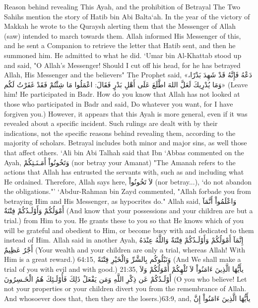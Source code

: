 \documentclass[11pt,a4paper,openany]{book}
\let\textAR\textarabic
\begin{document}
\begin{tafsirbox}
Reason behind revealing This Ayah, and the prohibition of Betrayal The Two Sahihs mention the story of Hatib bin Abi Balta`ah. In the year of the victory of Makkah he wrote to the Quraysh alerting them that the Messenger of Allah (saw) intended to march towards them. Allah informed His Messenger of this, and he sent a Companion to retrieve the letter that Hatib sent, and then he summoned him. He admitted to what he did. `Umar bin Al-Khattab stood up and said, "O Allah's Messenger! Should I cut off his head, for he has betrayed Allah, His Messenger and the believers" The Prophet said, \textAR{«دَعْهُ} \textAR{فَإِنَّهُ} \textAR{قَدْ} \textAR{شَهِدَ} \textAR{بَدْرًا،} \textAR{وَمَا} \textAR{يُدْرِيكَ} \textAR{لَعَلَّ} \textAR{اللهَ} \textAR{اطَّلَعَ} \textAR{عَلَى} \textAR{أَهْلِ} \textAR{بَدْرٍ} \textAR{فَقَالَ}: \textAR{اعْمَلُوا} \textAR{مَا} \textAR{شِئْتُمْ} \textAR{فَقَدْ} \textAR{غَفَرْتُ} \textAR{لَكُم»} (Leave him! He participated in Badr. How do you know that Allah has not looked at those who participated in Badr and said, Do whatever you want, for I have forgiven you.) However, it appears that this Ayah is more general, even if it was revealed about a specific incident. Such rulings are dealt with by their indications, not the specific reasons behind revealing them, according to the majority of scholars. Betrayal includes both minor and major sins, as well those that affect others. `Ali bin Abi Talhah said that Ibn `Abbas commented on the Ayah, \textAR{وَتَخُونُواْ} \textAR{أَمَـنَـتِكُمْ} (nor betray your Amanat) "The Amanah refers to the actions that Allah has entrusted the servants with, such as and including what He ordained. Therefore, Allah says here, \textAR{لاَ} \textAR{تَخُونُواْ} (nor betray...), `do not abandon the obligations."' `Abdur-Rahman bin Zayd commented, "Allah forbade you from betraying Him and His Messenger, as hypocrites do." Allah said, \textAR{وَاعْلَمُواْ} \textAR{أَنَّمَآ} \textAR{أَمْوَلُكُمْ} \textAR{وَأَوْلَـدُكُمْ} \textAR{فِتْنَةٌ} (And know that your possessions and your children are but a trial.) from Him to you. He grants these to you so that He knows which of you will be grateful and obedient to Him, or become busy with and dedicated to them instead of Him. Allah said in another Ayah, \textAR{إِنَّمَآ} \textAR{أَمْوَلُكُمْ} \textAR{وَأَوْلَـدُكُمْ} \textAR{فِتْنَةٌ} \textAR{وَاللَّهُ} \textAR{عِنْدَهُ} \textAR{أَجْرٌ} \textAR{عَظِيمٌ} (Your wealth and your children are only a trial, whereas Allah! With Him is a great reward.) 64:15, \textAR{وَنَبْلُوكُم} \textAR{بِالشَّرِّ} \textAR{وَالْخَيْرِ} \textAR{فِتْنَةً} (And We shall make a trial of you with evil and with good.) 21:35, \textAR{يأَيُّهَا} \textAR{الَّذِينَ} \textAR{ءَامَنُواْ} \textAR{لاَ} \textAR{تُلْهِكُمْ} \textAR{أَمْوَلُكُمْ} \textAR{وَلاَ} \textAR{أَوْلَـدُكُمْ} \textAR{عَن} \textAR{ذِكْرِ} \textAR{اللَّهِ} \textAR{وَمَن} \textAR{يَفْعَلْ} \textAR{ذَلِكَ} \textAR{فَأُوْلَـئِكَ} \textAR{هُمُ} \textAR{الْخَـسِرُونَ} (O you who believe! Let not your properties or your children divert you from the remembrance of Allah. And whosoever does that, then they are the losers.)63:9, and, \textAR{يأَيُّهَا} \textAR{الَّذِينَ} \textAR{ءَامَنُواْ} \textAR{إِنَّ} 
\end{tafsirbox}
\end{document}
